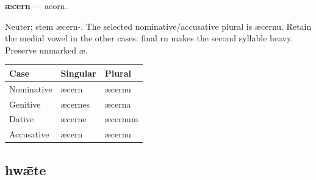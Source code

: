 \par\begin{minipage}{\linewidth}\raggedright
\textbf{æcern} — acorn.

Neuter; stem æcern-. The selected nominative/\allowbreak{}accusative plural is æcernu. Retain the medial vowel in the other cases: final rn makes the second syllable heavy. Preserve unmarked æ.

\par\begingroup
\fontsize{10.5}{13.2}\selectfont
\setlength{\LTleft}{0pt}\setlength{\LTright}{\fill}
\noindent
\begin{tabular}{@{}>{\raggedright\arraybackslash}p{39.46mm}>{\raggedright\arraybackslash}p{39.46mm}>{\raggedright\arraybackslash}p{39.46mm}@{}}
\toprule
\textbf{Case} & \textbf{Singular} & \textbf{Plural} \\
\midrule
Nominative & æcern & æcernu \\
Genitive & æcernes & æcerna \\
Dative & æcerne & æcernum \\
Accusative & æcern & æcernu \\
\bottomrule
\end{tabular}
\par\endgroup

\end{minipage}\par
{}
\subsection*{hwǣte}

